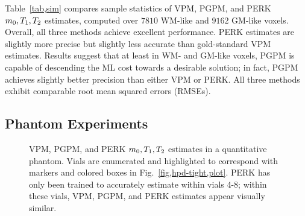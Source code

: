 Table~\ref{tab,sim} compares sample statistics
of VPM, PGPM, and PERK $m_0,T_1,T_2$ estimates,
computed over $7810$ WM-like and $9162$ GM-like voxels.
Overall,
all three methods achieve excellent performance.
PERK estimates are slightly more precise 
but slightly less accurate 
than gold-standard VPM estimates. 
Results suggest that 
at least in WM- and GM-like voxels,
PGPM is capable of descending the ML cost 
towards a desirable solution;
in fact, PGPM achieves slightly better precision
than either VPM or PERK.
All three methods exhibit comparable 
root mean squared errors (RMSEs).

\subsection{Phantom Experiments}
\label{ss,perk,exp,phant}

\begin{figure}[!t]
	\centering
	\begin{minipage}{\textwidth}
  	\hspace{0cm}
  	\hspace{0cm}
	\end{minipage}
	\caption{%
		VPM, PGPM, and PERK $m_0,T_1,T_2$ estimates 
		in a quantitative phantom.
		Vials are enumerated and highlighted
		to correspond with markers and colored boxes
		in Fig.~\ref{fig,hpd-tight,plot}.
		PERK has only been trained 
		to accurately estimate within vials 4-8;
		within these vials,
		VPM, PGPM, and PERK estimates 
		appear visually similar.
	}
	\label{fig,hpd-tight}
\end{figure}

